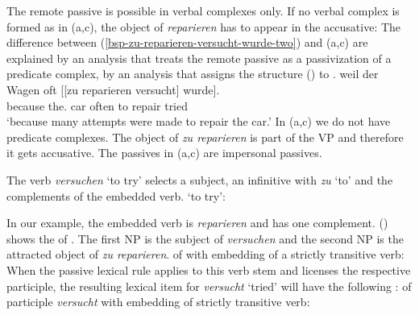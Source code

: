 \noindent
The remote passive is possible in verbal complexes only. If no verbal complex is formed as in
(a,c), the object of \emph{reparieren} has to appear in the accusative:
\eal
{}
\zl
The difference between (\ref{bsp-zu-reparieren-versucht-wurde-two}) and (a,c) are explained by an analysis that treats the remote passive as a passivization
of a predicate complex, \ie by an analysis that assigns the structure () to .
\ea
\gll weil    der        Wagen oft   [[zu reparieren versucht] wurde].\\
     because the.\NOM{} car   often \hphantom{[[}to repair   tried     \AUX\\
\glt `because many attempts were made to repair the car.'\label{bsp-zu-reparieren-versucht-wurde-three}
%
\z
In (a,c) we do not have predicate complexes. The object of \emph{zu reparieren} is part of the VP
and therefore it gets accusative. The passives in (a,c) are impersonal passives.


The verb \emph{versuchen} `to try' selects a subject, an infinitive with \emph{zu} `to' and the
complements of the embedded verb.
\ea
{} `to try':\\
\z

\noindent
In our example, the embedded verb is \emph{reparieren} and has one complement. () shows the
\argstv of . The first NP is the subject of \emph{versuchen} and the second NP is the
attracted object of \emph{zu reparieren}.
\ea
\argstv of  with embedding of a strictly transitive verb:\\
\z
When the passive lexical rule applies to this verb stem and licenses the respective participle, the
resulting lexical item for \emph{versucht} `tried' will have the following \argstv:
\ea
\argst of participle \emph{versucht} with embedding of strictly transitive verb:\\
\z

